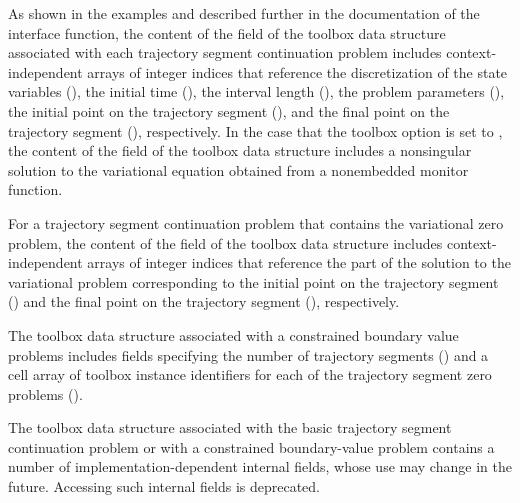 As shown in the examples and described further in the documentation of the  interface function, the content of the  field of the toolbox data structure associated with each trajectory segment continuation problem includes context-independent arrays of integer indices that reference the discretization of the state variables (), the initial time (), the interval length (), the problem parameters (), the initial point on the trajectory segment (), and the final point on the trajectory segment (), respectively. In the case that the  toolbox option is set to , the content of the  field of the toolbox data structure includes a nonsingular solution to the variational equation obtained from a nonembedded monitor function. 

For a trajectory segment continuation problem that contains the variational zero problem, the content of the  field of the toolbox data structure includes context-independent arrays of integer indices that reference the part of the solution to the variational problem corresponding to the initial point on the trajectory segment () and the final point on the trajectory segment (), respectively.

The toolbox data structure associated with a constrained boundary value problems includes fields specifying the number of trajectory segments () and a cell array of toolbox instance identifiers for each of the trajectory segment zero problems ().

The toolbox data structure associated with the basic trajectory segment continuation problem or with a constrained boundary-value problem contains a number of implementation-dependent internal fields, whose use may change in the future. Accessing such internal fields is deprecated.

